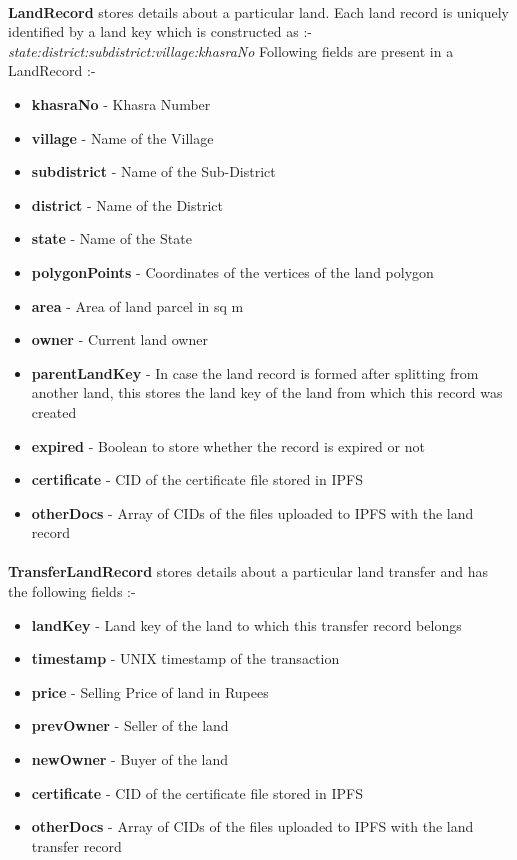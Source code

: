 \documentclass{article}
\begin{document}
        \paragraph{}
        \textbf{LandRecord} stores details about a particular land. Each land record is uniquely identified by a land key which is constructed as :-
        \textit{state:district:subdistrict:village:khasraNo}
        Following fields are present in a LandRecord :-
        \begin{itemize}
            \item \textbf{khasraNo} - Khasra Number
            \item \textbf{village} - Name of the Village
            \item \textbf{subdistrict} - Name of the Sub-District
            \item \textbf{district} - Name of the District
            \item \textbf{state} - Name of the State
            \item \textbf{polygonPoints} - Coordinates of the vertices of the land polygon
            \item \textbf{area} - Area of land parcel in sq m
            \item \textbf{owner} - Current land owner
            \item \textbf{parentLandKey} - In case the land record is formed after splitting from another land, this stores the land key of the land from which this record was created
            \item \textbf{expired} - Boolean to store whether the record is expired or not
            \item \textbf{certificate} - CID of the certificate file stored in IPFS
            \item \textbf{otherDocs} - Array of CIDs of the files uploaded to IPFS with the land record
        \end{itemize}

        \paragraph{}
        \textbf{TransferLandRecord} stores details about a particular land transfer and has the following fields :-
        \begin{itemize}
            \item \textbf{landKey} - Land key of the land to which this transfer record belongs
            \item \textbf{timestamp} - UNIX timestamp of the transaction
            \item \textbf{price} - Selling Price of land in Rupees
            \item \textbf{prevOwner} - Seller of the land
            \item \textbf{newOwner} - Buyer of the land
            \item \textbf{certificate} - CID of the certificate file stored in IPFS
            \item \textbf{otherDocs} - Array of CIDs of the files uploaded to IPFS with the land transfer record
        \end{itemize}
\end{document}
